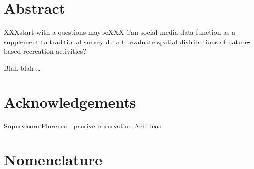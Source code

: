 




\cleardoublepage

\chapter*{Abstract}
 XXXstart with a questions maybeXXX
 Can social media data function as a supplement to traditional survey data to evaluate spatial distributions of nature-based recreation activities?

Blah blah \dots

\cleardoublepage

\chapter*{Acknowledgements} \label{acknowledgements}
Supervisors
Florence - passive observation
Achilleas

\cleardoublepage

 \setcounter{tocdepth}{2}
 \tableofcontents
 \listoftables{}
 \listoffigures{}

 \cleardoublepage


\chapter*{Nomenclature}\label{chap:symbole}


